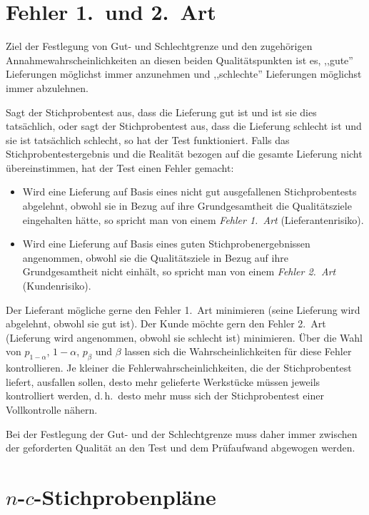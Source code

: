 \documentclass[a4paper,11pt,oneside]{article}
\begin{document}
\section{Fehler 1.\ und 2.\ Art}

Ziel der Festlegung von Gut- und Schlechtgrenze und den zugehörigen Annahmewahrscheinlichkeiten an diesen beiden Qualitätspunkten ist es, ,,gute'' Lieferungen möglichst immer anzunehmen und ,,schlechte'' Lieferungen möglichst immer abzulehnen.

Sagt der Stichprobentest aus, dass die Lieferung gut ist und ist sie dies tatsächlich, oder sagt der Stichprobentest aus, dass die Lieferung schlecht ist und sie ist tatsächlich schlecht, so hat der Test funktioniert. Falls das Stichprobentestergebnis und die Realität bezogen auf die gesamte Lieferung nicht übereinstimmen, hat der Test einen Fehler gemacht:

\begin{itemize}
\item
Wird eine Lieferung auf Basis eines nicht gut ausgefallenen Stichprobentests abgelehnt, obwohl sie in Bezug auf ihre Grundgesamtheit die Qualitätsziele eingehalten hätte, so spricht man von einem \emph{Fehler 1.\ Art} (Lieferantenrisiko).
\item
Wird eine Lieferung auf Basis eines guten Stichprobenergebnissen angenommen, obwohl sie die Qualitätsziele in Bezug auf ihre Grundgesamtheit nicht einhält, so spricht man von einem \emph{Fehler 2.\ Art} (Kundenrisiko).
\end{itemize}

Der Lieferant mögliche gerne den Fehler 1.\ Art minimieren (seine Lieferung wird abgelehnt, obwohl sie gut ist). Der Kunde möchte gern den Fehler 2.\ Art (Lieferung wird angenommen, obwohl sie schlecht ist) minimieren. Über die Wahl von $p_{1-\alpha}$, $1-\alpha$, $p_\beta$ und $\beta$ lassen sich die Wahrscheinlichkeiten für diese Fehler kontrollieren. Je kleiner die Fehlerwahrscheinlichkeiten, die der Stichprobentest liefert, ausfallen sollen, desto mehr gelieferte Werkstücke müssen jeweils kontrolliert werden, d.\,h.\ desto mehr muss sich der Stichprobentest einer Vollkontrolle nähern.

Bei der Festlegung der Gut- und der Schlechtgrenze muss daher immer zwischen der geforderten Qualität an den Test und dem Prüfaufwand abgewogen werden.



\section[n-c-Stichprobenpläne]{$n$-$c$-Stichprobenpläne}
\end{document}
